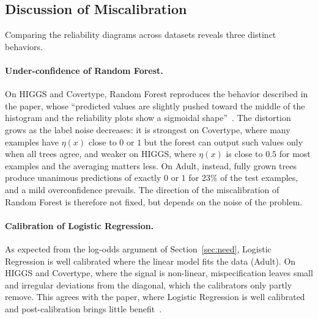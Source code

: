 \documentclass[a4paper, 10pt]{article}
\begin{document}
\subsection{Discussion of Miscalibration}\label{sec:miscalibration}
Comparing the reliability diagrams across datasets reveals three distinct behaviors.

\paragraph{Under-confidence of Random Forest.} 
On HIGGS and Covertype, Random Forest reproduces the behavior described in the paper, whose ``predicted values are slightly pushed toward the middle of the histogram and the reliability plots show a sigmoidal shape''~\cite{niculescu2005predicting}. The distortion grows as the label noise decreases: it is strongest on Covertype, where many examples have $\eta(x)$ close to $0$ or $1$ but the forest can output such values only when all trees agree, and weaker on HIGGS, where $\eta(x)$ is close to $0.5$ for most examples and the averaging matters less. On Adult, instead, fully grown trees produce unanimous predictions of exactly $0$ or $1$ for 23\% of the test examples, and a mild overconfidence prevails. The direction of the miscalibration of Random Forest is therefore not fixed, but depends on the noise of the problem.

\paragraph{Calibration of Logistic Regression.}
As expected from the log-odds argument of Section~\ref{sec:need}, Logistic Regression is well calibrated where the linear model fits the data (Adult). On HIGGS and Covertype, where the signal is non-linear, mispecification leaves small and irregular deviations from the diagonal, which the calibrators only partly remove. This agrees with the paper, where Logistic Regression is well calibrated and post-calibration brings little benefit~\cite{niculescu2005predicting}.
\end{document}

